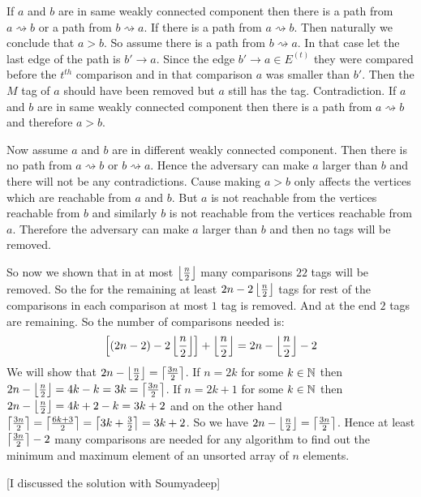 \documentclass[a4paper, 11pt]{article}
\begin{document}
{If $a$ and $b$ are in same weakly connected component then there is a path from $a\rightsquigarrow b$ or a path from $b\rightsquigarrow a$. If there is a path from $a\rightsquigarrow b$. Then naturally we conclude that $a>b$. So assume there is a path from $b\rightsquigarrow a$. In that case let the last edge of the path is $b'\to a$. Since the edge $b'\to a\in E^{(t)}$ they were compared before the $t^{th}$ comparison and in that comparison $a$ was smaller than $b'$. Then the $M$ tag of $a$ should have been removed but $a$ still has the tag. Contradiction. If $a$ and $b$ are in same weakly connected component then there is a path from $a\rightsquigarrow b$ and therefore $a>b$.

Now assume $a$ and $b$ are in different weakly connected component. Then there is no path from $a\rightsquigarrow b$ or $b\rightsquigarrow a$. Hence the adversary can make $a$ larger than $b$ and there will not be any contradictions. Cause making $a>b$ only affects the vertices which are reachable from $a$ and $b$. But $a$ is not reachable from the vertices reachable from $b$ and similarly $b$ is not reachable from the vertices reachable from $a$. Therefore the adversary can make $a$ larger than $b$ and then no tags will be removed.

So now we shown that in at most $\left\lfloor \frac{n}2\right\rfloor$ many comparisons $22$ tags will be removed. So the for the remaining at least $2n-2\left\lfloor \frac{n}2\right\rfloor$ tags for rest of the comparisons in each comparison at most $1$ tag is removed. And at the end $2$ tags are remaining. So the number of comparisons needed is:$$\left[(2n-2)-2\left\lfloor \frac{n}2\right\rfloor\right]+\left\lfloor \frac{n}2\right\rfloor=2n-\left\lfloor \frac{n}2\right\rfloor-2$$We will show that $2n-\left\lfloor \frac{n}2\right\rfloor=\left\lceil\frac{3n}2\right\rceil$. If $n=2k$ for some $k\in\mathbb{N}$ then $2n-\left\lfloor \frac{n}2\right\rfloor=4k-k=3k=\left\lceil \frac{3n}2\right\rceil$. If $n=2k+1$ for some $k\in\mathbb{N}$ then $2n-\left\lfloor \frac{n}2\right\rfloor=4k+2-k=3k+2$ and on the other hand $ \left\lceil \frac{3n}2\right\rceil=\left\lceil \frac{6k+3}{2}\right\rceil=\left\lceil3k+\frac32\right\rceil=3k+2$. So we have $2n-\left\lfloor \frac{n}2\right\rfloor=\left\lceil\frac{3n}2\right\rceil$. Hence at least $\left\lceil\frac{3n}2\right\rceil-2$ many comparisons are needed for any algorithm to find out the minimum and maximum element of an unsorted array of $n$ elements.
}\parinf

[I discussed the solution with Soumyadeep]

\end{document}
